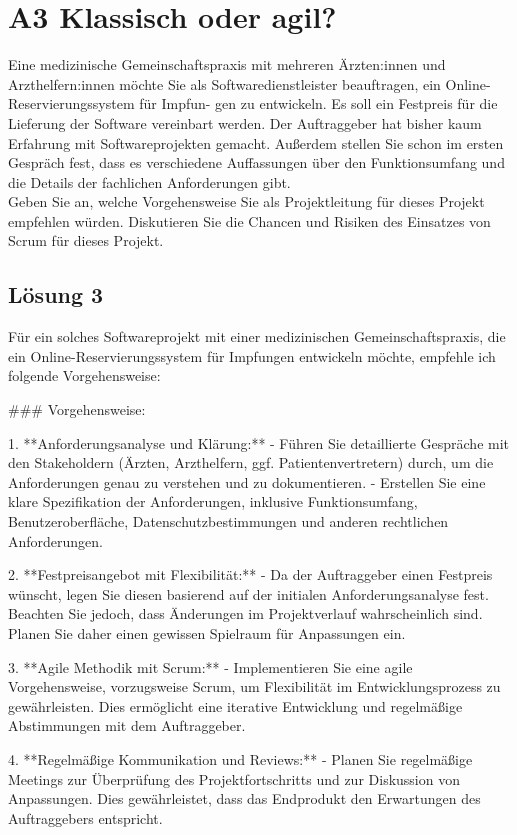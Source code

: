 \documentclass[main.tex]{subfiles}
\begin{document}
\section{A3 Klassisch oder agil?}

Eine medizinische Gemeinschaftspraxis mit mehreren Ärzten:innen und Arzthelfern:innen
möchte Sie als Softwaredienstleister beauftragen, ein Online-Reservierungssystem für Impfun-
gen zu entwickeln. Es soll ein Festpreis für die Lieferung der Software vereinbart werden. Der
Auftraggeber hat bisher kaum Erfahrung mit Softwareprojekten gemacht. Außerdem stellen Sie
schon im ersten Gespräch fest, dass es verschiedene Auffassungen über den Funktionsumfang
und die Details der fachlichen Anforderungen gibt.\\

Geben Sie an, welche Vorgehensweise Sie als Projektleitung für dieses Projekt empfehlen würden.
Diskutieren Sie die Chancen und Risiken des Einsatzes von Scrum für dieses Projekt.

\subsection{Lösung 3}
Für ein solches Softwareprojekt mit einer medizinischen Gemeinschaftspraxis, die ein Online-Reservierungssystem für Impfungen entwickeln möchte, empfehle ich folgende Vorgehensweise:

### Vorgehensweise:

1. **Anforderungsanalyse und Klärung:**
   - Führen Sie detaillierte Gespräche mit den Stakeholdern (Ärzten, Arzthelfern, ggf. Patientenvertretern) durch, um die Anforderungen genau zu verstehen und zu dokumentieren.
   - Erstellen Sie eine klare Spezifikation der Anforderungen, inklusive Funktionsumfang, Benutzeroberfläche, Datenschutzbestimmungen und anderen rechtlichen Anforderungen.

2. **Festpreisangebot mit Flexibilität:**
   - Da der Auftraggeber einen Festpreis wünscht, legen Sie diesen basierend auf der initialen Anforderungsanalyse fest. Beachten Sie jedoch, dass Änderungen im Projektverlauf wahrscheinlich sind. Planen Sie daher einen gewissen Spielraum für Anpassungen ein.

3. **Agile Methodik mit Scrum:**
   - Implementieren Sie eine agile Vorgehensweise, vorzugsweise Scrum, um Flexibilität im Entwicklungsprozess zu gewährleisten. Dies ermöglicht eine iterative Entwicklung und regelmäßige Abstimmungen mit dem Auftraggeber.

4. **Regelmäßige Kommunikation und Reviews:**
   - Planen Sie regelmäßige Meetings zur Überprüfung des Projektfortschritts und zur Diskussion von Anpassungen. Dies gewährleistet, dass das Endprodukt den Erwartungen des Auftraggebers entspricht.
\end{document}
